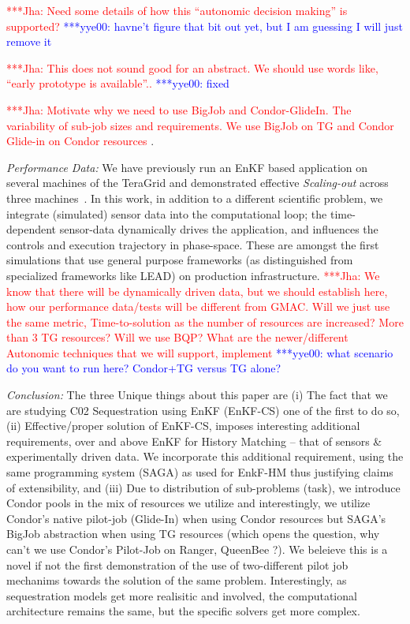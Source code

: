 \documentclass[conference,final]{IEEEtran}
\newcommand{\jhanote}[1]{ {\textcolor{red} { ***Jha: #1 }}}
\newcommand{\yyenote}[1]{ {\textcolor{blue} { ***yye00: #1 }}}
\newcommand{\jhanote}[1]{}
\newcommand{\yyenote}[1]{}
\begin{document}
\jhanote{Need some details of how this ``autonomic decision making'' is supported?}
\yyenote{havne't figure that bit out yet, but I am guessing I will just remove it}

\jhanote{This does not sound good for an abstract. We should use words like, ``early prototype is available''..}
\yyenote{fixed}

\jhanote{Motivate why we need to use BigJob and Condor-GlideIn. The variability of
sub-job sizes and requirements. We use BigJob on TG and Condor Glide-in on Condor
resources}.

{\it Performance Data: }We have previously run an EnKF based application on several machines of the TeraGrid and demonstrated 
effective {\it Scaling-out} across three machines~\cite{gmac}. In this work, in addition to a different scientific problem, we 
integrate (simulated) sensor data into the computational loop; the time-dependent sensor-data dynamically drives the application, 
and influences the controls and execution trajectory in phase-space. These are amongst the first simulations that use general 
purpose frameworks (as distinguished from specialized frameworks like LEAD) on production infrastructure. \jhanote{We know that 
there will be dynamically driven data, but we should establish here, how our performance data/tests will be different from GMAC.  
Will we just use the same metric, Time-to-solution as the number of resources are increased? More than 3 TG resources? Will we use 
BQP? What are the newer/different Autonomic techniques that we will support, implement} \yyenote{what scenario do you want to run
here? Condor+TG versus TG alone?}


{\it Conclusion: } The three Unique things about this paper are (i) The fact that we are studying C02 Sequestration using EnKF 
(EnKF-CS) one of the first to do so, (ii) Effective/proper solution of EnKF-CS, imposes interesting additional requirements, over 
and above EnKF for History Matching -- that of sensors \& experimentally driven data. We incorporate this additional requirement, 
using the same programming system (SAGA) as used for EnkF-HM thus justifying claims of extensibility, and (iii) Due to 
distribution of sub-problems (task), we introduce Condor pools in the mix of resources we utilize and interestingly, we utilize 
Condor's native pilot-job (Glide-In) when using Condor resources but SAGA's BigJob abstraction when using TG resources (which 
opens the question, why can't we use Condor's Pilot-Job on Ranger, QueenBee ?). We beleieve this is a novel if not the first 
demonstration of the use of two-different pilot job mechanims towards the solution of the same problem. Interestingly, as 
sequestration models get more realisitic and involved, the computational architecture remains the same, but the specific solvers 
get more complex.
\end{document}
